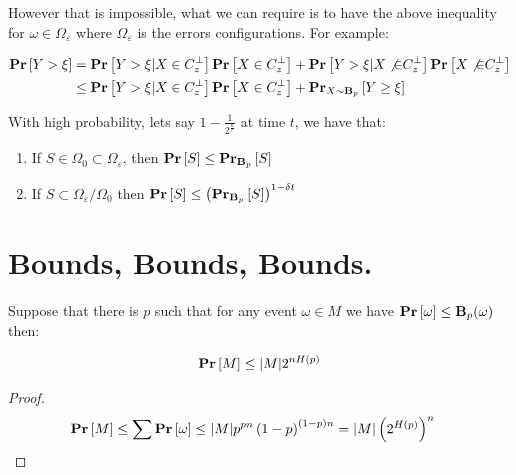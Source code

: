 \documentclass[manuscript,screen,review]{acmart}
\begin{document}
However that is impossible, what we can require is to have the above inequality for $\omega \in \Omega_{\varepsilon}$ where $\Omega_{\varepsilon}$ is the errors configurations. For example: 


\begin{equation*}
  \begin{split}
  \prb{Y > \xi }&=   \prb{Y > \xi | X \in C_{z}^{\perp} } \prb{ X \in C_{z}^{\perp}} +  \prb{Y > \xi | X \not{\in} C_{z}^{\perp} } \prb{ X \not{\in} C_{z}^{\perp}} \\
  & \le \prb{Y > \xi | X \in C_{z}^{\perp} } \prb{ X \in C_{z}^{\perp}} + \prbm{ Y \ge \xi  }{ X \sim \mathbf{B}_{p}  } 
  \end{split}
\end{equation*}



With high probability, lets say $1 - \frac{1}{2^{\frac{n}{t}}}$ at time $t$, we have that:
\begin{enumerate}
  \item If $S \in  \Omega_{0} \subset \Omega_{\varepsilon} $, then $\prb{S} \le \prbm{S}{\mathbf{B}_{p}}$
  \item If $S \subset \Omega_{\varepsilon} / \Omega_{0}$ then   $\prb{S} \le \left(\prbm{S}{\mathbf{B}_{p}}\right)^{1-\delta t}$  %
\end{enumerate}

\section{Bounds, Bounds, Bounds.}

\begin{claim}
  Suppose that there is $p$ such that for any event $\omega \in M$ we have $\prb{\omega} \le \mathbf{B}_{p}(\omega)$ then: 

  \begin{equation*}
    \begin{split}
      \prb{M} \le |M| 2^{nH(p)}
    \end{split}
  \end{equation*}

\end{claim}
\begin{proof}

  \begin{equation*}
    \begin{split}
      \prb{M} & \le \sum \prb{\omega} \le |M| p^{pn}\left( 1 - p \right)^{(1-p)n} = |M| \left( 2^{H(p)} \right)^{n} 
    \end{split}
  \end{equation*}
\end{proof}
\end{document}

